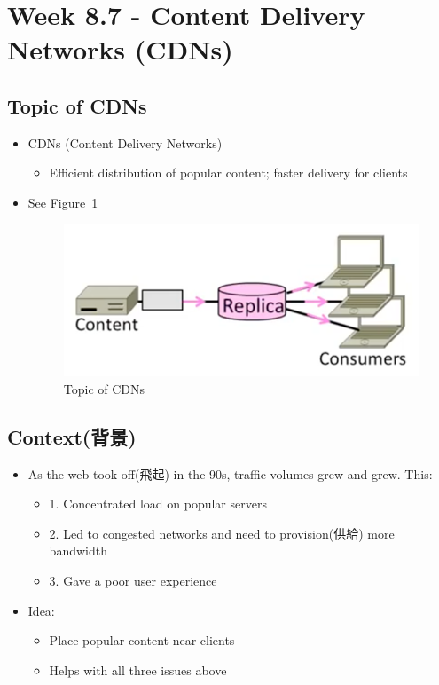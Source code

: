 \documentclass[12pt]{ctexart}   %
\begin{document}
\section{Week 8.7 - Content Delivery Networks (CDNs)}	
	\subsection{Topic of CDNs}
	\begin{itemize}
		\item CDNs (Content Delivery Networks)
		\begin{itemize}
			\item Efficient distribution of popular content; faster delivery for clients
		\end{itemize}
		\item See Figure~\ref{fig:8-7-1}
		  
		 \begin{figure}[h!] %
		\centering
		 \includegraphics[scale=0.7]{images/8-7-1}
		\caption{ Topic of CDNs }
		 \label{fig:8-7-1}
		 \end{figure}
	\end{itemize}
	
	\subsection{Context(背景)}
	\begin{itemize}
		\item As the web took off(飛起) in the 90s, traffic volumes grew and grew. This:
		\begin{itemize}
			\item {\color{blue} 1.} Concentrated load on popular servers
			\item {\color{blue} 2.} Led to congested networks and need to provision(供給) more bandwidth
			\item {\color{blue} 3.} Gave a poor user experience
		\end{itemize}
		
		\item Idea:
		\begin{itemize}
			\item Place popular content near clients
			\item Helps with all three issues above
		\end{itemize}
	\end{itemize}
	
\end{document}
